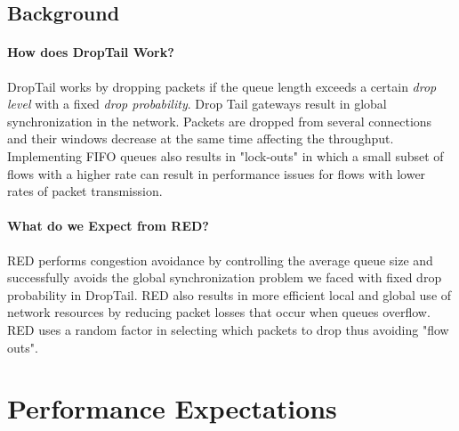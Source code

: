\documentclass[paper=a4, fontsize=12pt]{scrartcl} %
\numberwithin{equation}{section} %
\numberwithin{figure}{section} %
\numberwithin{table}{section} %
\begin{document}

\newpage
\subsection{Background}

\paragraph{\newline How does DropTail Work?\newline} 
\hspace{-10pt} DropTail works by dropping packets if the queue length exceeds a certain\emph{ drop level} with a fixed\emph{ drop probability}. Drop Tail gateways result in global synchronization in the network. Packets are dropped from several connections and their windows decrease at the same time affecting the throughput. Implementing FIFO queues also results in "lock-outs" in which a small subset of flows with a higher rate can result in performance issues for flows with lower rates of packet transmission. 

\paragraph{ What do we Expect from RED?\newline} 
\hspace{-10pt}RED performs congestion avoidance by controlling the average queue size and successfully avoids the global synchronization problem we faced with fixed drop probability in DropTail. RED also results in more efficient local and global use of network resources by reducing packet losses that occur when queues overflow. RED uses a random factor in selecting which packets to drop thus avoiding "flow outs". 


\section{Performance Expectations}

\end{document}
